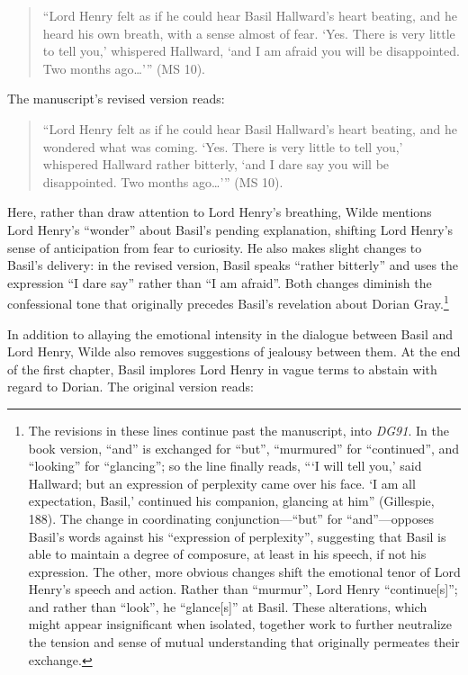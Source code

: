 \documentclass[11pt]{article}
\begin{document}
\begin{quote}
“Lord Henry felt as if he could hear Basil Hallward’s heart beating,
and he heard his own breath, with a sense almost of fear. ‘Yes. There
is very little to tell you,’ whispered Hallward, ‘and I am afraid you
will be disappointed. Two months ago\ldots{}’” (MS 10).
\end{quote}

The manuscript’s revised version reads: 

\begin{quote}
“Lord Henry felt as if he could hear Basil Hallward’s heart beating,
and he wondered what was coming. ‘Yes. There is very little to tell
you,’ whispered Hallward rather bitterly, ‘and I dare say you will be
disappointed. Two months ago\ldots{}’” (MS 10).
\end{quote}

Here, rather than draw attention to Lord Henry’s breathing, Wilde
mentions Lord Henry’s “wonder” about Basil’s pending explanation,
shifting Lord Henry’s sense of anticipation from fear to curiosity. He
also makes slight changes to Basil’s delivery: in the revised version,
Basil speaks “rather bitterly” and uses the expression “I dare say”
rather than “I am afraid”. Both changes diminish the confessional tone
that originally precedes Basil’s revelation about Dorian Gray.\footnote{The revisions in these lines continue past the manuscript, into
\emph{DG91}. In the book version, “and” is exchanged for “but”, “murmured”
for “continued”, and “looking” for “glancing”; so the line finally
reads, “‘I will tell you,’ said Hallward; but an expression of
perplexity came over his face. ‘I am all expectation, Basil,’
continued his companion, glancing at him” (Gillespie, 188). The change
in coordinating conjunction—“but” for “and”—opposes Basil’s words
against his “expression of perplexity”, suggesting that Basil is able
to maintain a degree of composure, at least in his speech, if not his
expression. The other, more obvious changes shift the emotional tenor
of Lord Henry’s speech and action. Rather than “murmur”, Lord Henry
“continue[s]”; and rather than “look”, he “glance[s]” at Basil. These
alterations, which might appear insignificant when isolated, together
work to further neutralize the tension and sense of mutual
understanding that originally permeates their exchange.}

In addition to allaying the emotional intensity in the dialogue
between Basil and Lord Henry, Wilde also removes suggestions of
jealousy between them. At the end of the first chapter, Basil implores
Lord Henry in vague terms to abstain with regard to Dorian. The
original version reads:
\end{document}

